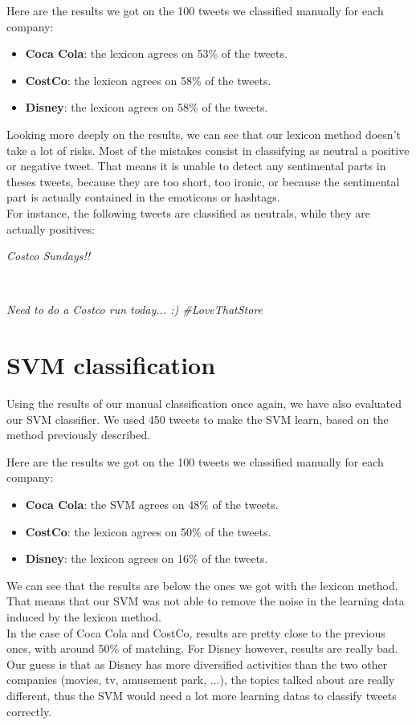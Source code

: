 \documentclass[a4paper,12pt]{report}
\begin{document}
Here are the results we got on the 100 tweets we classified manually for each company:
\begin{itemize}
        \item \textbf{Coca Cola}: the lexicon agrees on 53\% of the tweets.
        \item \textbf{CostCo}: the lexicon agrees on 58\% of the tweets.
        \item \textbf{Disney}: the lexicon agrees on 58\% of the tweets.
\end{itemize}
Looking more deeply on the results, we can see that our lexicon method doesn't take a lot of risks.
Most of the mistakes consist in classifying as neutral a positive or negative tweet. That means it is unable to detect any sentimental parts in theses tweets, because they are too short, too ironic, or because the sentimental part is actually contained in the emoticons or hashtags.\\
For instance, the following tweets are classified as neutrals, while they are actually positives:\\
\centerline{\textit{Costco Sundays!!}}\\
\centerline{\textit{Need to do a Costco run today... :) \#LoveThatStore}}

\section{SVM classification}

Using the results  of our manual classification once again, we have also evaluated our SVM classifier.
We used 450 tweets to make the SVM learn, based on the method previously described.

Here are the results we got on the 100 tweets we classified manually for each company:
\begin{itemize}
        \item \textbf{Coca Cola}: the SVM agrees on 48\% of the tweets.
        \item \textbf{CostCo}: the lexicon agrees on 50\% of the tweets.
        \item \textbf{Disney}: the lexicon agrees on 16\% of the tweets.
\end{itemize}
We can see that the results are below the ones we got with the lexicon method.
That means that our SVM was not able to remove the noise in the learning data induced by the lexicon method.\\
In the case of Coca Cola and CostCo, results are pretty close to the previous ones, with around 50\% of matching.
For Disney however, results are really bad. Our guess is that as Disney has more diversified activities than the two other companies (movies, tv, amusement park, ...), the topics talked about are really different, thus the SVM would need a lot more learning datas to classify tweets correctly.
\end{document}
